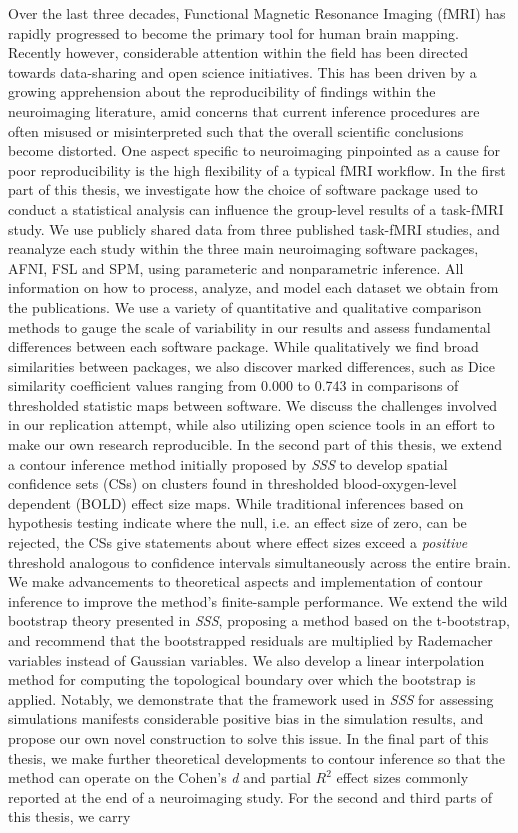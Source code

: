 \documentclass[11pt,a4paper]{report}      %
\begin{document}
\begin{thesisabstract}
\begin{singlespace}
Over the last three decades, Functional Magnetic Resonance Imaging (fMRI) has rapidly progressed to become the primary tool for human brain mapping. Recently however, considerable attention within the field has been directed towards data-sharing and open science initiatives. This has been driven by a growing apprehension about the reproducibility of findings within the neuroimaging literature, amid concerns that current inference procedures are often misused or misinterpreted such that the overall scientific conclusions become distorted. One aspect specific to neuroimaging pinpointed as a cause for poor reproducibility is the high flexibility of a typical fMRI workflow. In the first part of this thesis, we investigate how the choice of software package used to conduct a statistical analysis can influence the group-level results of a task-fMRI study. We use publicly shared data from three published task-fMRI studies, and reanalyze each study within the three main neuroimaging software packages, AFNI, FSL and SPM, using parameteric and nonparametric inference. All information on how to process, analyze, and model each dataset we obtain from the publications. We use a variety of quantitative and qualitative comparison methods to gauge the scale of variability in our results and assess fundamental differences between each software package. While qualitatively we find broad similarities between packages, we also discover marked differences, such as Dice similarity coefficient values ranging from 0.000 to 0.743 in comparisons of thresholded statistic maps between software. We discuss the challenges involved in our replication attempt, while also utilizing open science tools in an effort to make our own research reproducible. In the second part of this thesis, we extend a contour inference method initially proposed by \citet*{Sommerfeld2018-zl} \textit{SSS} to develop spatial confidence sets (CSs) on clusters found in thresholded blood-oxygen-level dependent (BOLD) effect size maps. While traditional inferences based on hypothesis testing indicate where the null, i.e. an effect size of zero, can be rejected, the CSs give statements about where effect sizes exceed a \textit{positive} threshold analogous to confidence intervals simultaneously across the entire brain. We make advancements to theoretical aspects and implementation of contour inference to improve the method's finite-sample performance. We extend the wild bootstrap theory presented in \textit{SSS}, proposing a method based on the t-bootstrap, and recommend that the bootstrapped residuals are multiplied by Rademacher variables instead of Gaussian variables. We also develop a linear interpolation method for computing the topological boundary over which the bootstrap is applied. Notably, we demonstrate that the framework used in \textit{SSS} for assessing simulations manifests considerable positive bias in the simulation results, and propose our own novel construction to solve this issue. In the final part of this thesis, we make further theoretical developments to contour inference so that the method can operate on the Cohen's \textit{d} and partial $R^{2}$ effect sizes commonly reported at the end of a neuroimaging study. For the second and third parts of this thesis, we carry 
\end{singlespace}
\end{thesisabstract}
\end{document}
